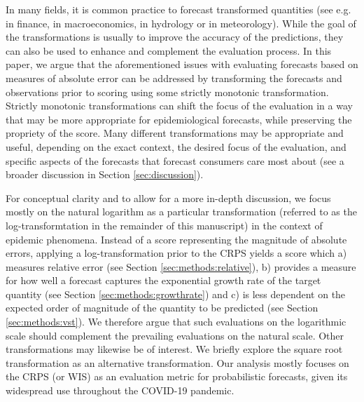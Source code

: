 \documentclass{article}
\begin{document}
In many fields, it is common practice to forecast transformed quantities (see e.g. \cite{taylorEvaluatingVolatilityInterval1999} in finance, \cite{mayrLogLevelVAR2015} in macroeconomics, \cite{loweStochasticRainfallrunoffForecasting2014} in hydrology or \cite{fuglstadDoesNonstationarySpatial2015} in meteorology). While the goal of the transformations is usually to improve the accuracy of the predictions, they can also be used to enhance and complement the evaluation process. 
In this paper, we argue that the aforementioned issues with evaluating forecasts based on measures of absolute error can be addressed by transforming the forecasts and observations prior to scoring using some strictly monotonic transformation. Strictly monotonic transformations can shift the focus of the evaluation in a way that may be more appropriate for epidemiological forecasts, while preserving the propriety of the score. Many different transformations may be appropriate and useful, depending on the exact context, the desired focus of the evaluation, and specific aspects of the forecasts that forecast consumers care most about (see a broader discussion in Section \ref{sec:discussion}). 

For conceptual clarity and to allow for a more in-depth discussion, we focus mostly on the natural logarithm as a particular transformation (referred to as the log-transformtation in the remainder of this manuscript) in the context of epidemic phenomena. Instead of a score representing the magnitude of absolute errors, applying a log-transformation prior to the CRPS yields a score which a) measures relative error (see Section \ref{sec:methods:relative}), b) provides a measure for how well a forecast captures the exponential growth rate of the target quantity (see Section \ref{sec:methods:growthrate}) and c) is less dependent on the expected order of magnitude of the quantity to be predicted (see Section \ref{sec:methods:vst}). %
We therefore argue that such evaluations on the logarithmic scale should complement the prevailing evaluations on the natural scale. 
Other transformations may likewise be of interest. We briefly explore the square root transformation as an alternative transformation. %
Our analysis mostly focuses on the CRPS (or WIS) as an evaluation metric for probabilistic forecasts, given its widespread use throughout the COVID-19 pandemic. 
\end{document}

